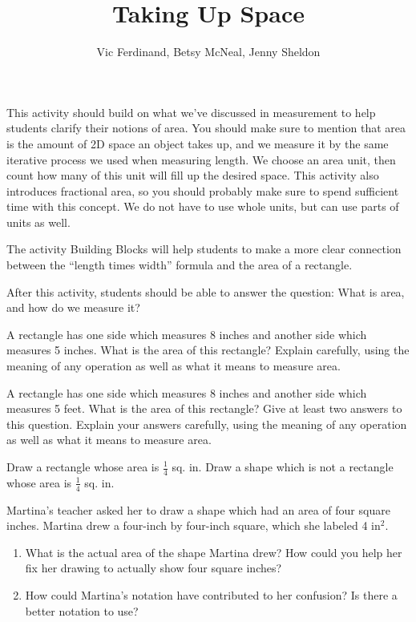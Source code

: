 \documentclass{ximera}
\title{Taking Up Space}
\author{Vic Ferdinand, Betsy McNeal, Jenny Sheldon}
\begin{document}
\begin{abstract}
\end{abstract}
\maketitle

\begin{instructorIntro}
This activity should build on what we've discussed in measurement to help students clarify their notions of area.  You should make sure to mention that area is the amount of 2D space an object takes up, and we measure it by the same iterative process we used when measuring length.  We choose an area unit, then count how many of this unit will fill up the desired space.  This activity also introduces fractional area, so you should probably make sure to spend sufficient time with this concept.  We do not have to use whole units, but can use parts of units as well.

The activity Building Blocks will help students to make a more clear connection between the ``length times width'' formula and the area of a rectangle.  

After this activity, students should be able to answer the question: What is area, and how do we measure it?
\end{instructorIntro}

\begin{problem}
A rectangle has one side which measures 8 inches and another side which measures 5 inches.  What is the area of this rectangle?  Explain carefully, using the meaning of any operation as well as what it means to measure area.


\end{problem}

\begin{problem}
A rectangle has one side which measures 8 inches and another side which measures 5 feet.  What is the area of this rectangle?  Give at least two answers to this question.  Explain your answers carefully, using the meaning of any operation as well as what it means to measure area.

\end{problem}


\begin{problem}
Draw a rectangle whose area is $\frac{1}{4}$ sq. in.  Draw a shape which is not a rectangle whose area is $\frac{1}{4}$ sq. in.


\end{problem}

\begin{problem}
Martina's teacher asked her to draw a shape which had an area of four square inches.  Martina drew a four-inch by four-inch square, which she labeled 4 in$^2$.

\begin{enumerate}
\item What is the actual area of the shape Martina drew?  How could you help her fix her drawing to actually show four square inches?
\item How could Martina's notation have contributed to her confusion?  Is there a better notation to use?
\end{enumerate}
\end{problem}
\end{document}
